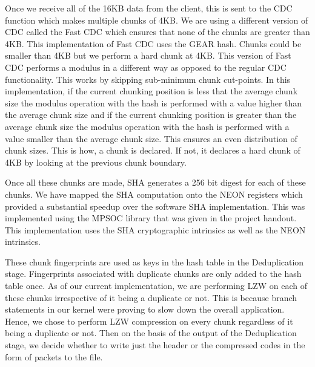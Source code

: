 \documentclass[../main.tex]{subfiles}
\begin{document}
\begin{enumerate}
    Once we receive all of the 16KB data from the client, this is sent to the CDC function which makes multiple chunks of 4KB. We are using a different version of CDC called the Fast CDC which ensures that none of the chunks are greater than 4KB. This implementation of Fast CDC uses the GEAR hash. Chunks could be smaller than 4KB but we perform a hard chunk at 4KB. This version of Fast CDC performs a modulus in a different way as opposed to the regular CDC functionality. This works by skipping sub-minimum chunk cut-points. In this implementation, if the current chunking position is
    less that the average chunk size the modulus operation with the hash is performed with a value higher than the average chunk size and if the current chunking position is greater than the average chunk size the modulus operation with the hash is performed with a value smaller than
    the average chunk size. This ensures an even distribution of chunk sizes. This is how, a chunk is declared. If not, it declares a hard chunk of 4KB by looking at the previous chunk boundary. 
    
    Once all these chunks are made, SHA generates a 256 bit digest for each of these chunks. We have mapped the SHA computation onto the NEON registers which provided a substantial speedup over the software SHA implementation. This was implemented using the MPSOC library that was given in the project handout. This implementation uses the SHA cryptographic intrinsics as well as the NEON intrinsics. 
    
    These chunk fingerprints are used as keys in the hash table in the Deduplication stage. Fingerprints associated with duplicate chunks are only added to the hash table once. As of our current implementation, we are performing LZW on each of these chunks irrespective of it being a duplicate or not. This is because branch statements in our kernel were proving to slow down the overall application. Hence, we chose to perform LZW compression on every chunk regardless of it being a duplicate or not. Then on the basis of the output of the Deduplication stage, we decide whether to write just the header or the compressed codes in the form of packets to the file. 


\end{enumerate}
\end{document}
